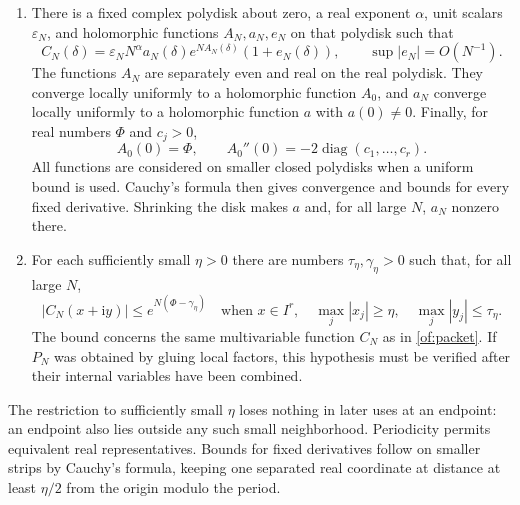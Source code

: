 \documentclass[11pt]{article}
\numberwithin{equation}{section}
\theoremstyle{definition}\newtheorem{definition}[theorem]{Definition}
\theoremstyle{remark}\newtheorem{remark}[theorem]{Remark}
\newcommand{\ii}{\mathrm i}
\begin{document}
\begin{enumerate}[label=(\roman*)]
\item\label{of:Hlocal}
There is a fixed complex polydisk about zero, a real exponent $\alpha$,
unit scalars $\varepsilon_N$, and holomorphic functions $A_N,a_N,e_N$
on that polydisk such that
\begin{equation}\label{of:packet}
 C_N(\delta)=\varepsilon_N N^\alpha a_N(\delta)
                   e^{NA_N(\delta)}(1+e_N(\delta)),
 \qquad \sup|e_N|=O(N^{-1}).
\end{equation}
The functions $A_N$ are separately even and real on the real polydisk.
They converge locally uniformly to a holomorphic function $A_0$, and
$a_N$ converge locally uniformly to a holomorphic function $a$ with
$a(0)\ne0$. Finally, for real numbers $\Phi$ and $c_j>0$,
\begin{equation}\label{of:hessian}
 A_0(0)=\Phi,\qquad A_0''(0)=-2\operatorname{diag}(c_1,\ldots,c_r).
\end{equation}
All functions are considered on smaller closed polydisks when a
uniform bound is used. Cauchy's formula then gives convergence and
bounds for every fixed derivative. Shrinking the disk makes $a$ and,
for all large $N$, $a_N$ nonzero there.

\item\label{of:Hgap}
For each sufficiently small $\eta>0$ there are numbers
$\tau_\eta,\gamma_\eta>0$ such that, for all large $N$,
\begin{equation}\label{of:gap}
 |C_N(x+\ii y)|\le e^{N(\Phi-\gamma_\eta)}
 \quad\text{when }x\in I^r,\quad
 \max_j|x_j|\ge\eta,\quad \max_j|y_j|\le\tau_\eta.
\end{equation}
The bound concerns the same multivariable function $C_N$ as in
\eqref{of:packet}. If $P_N$ was obtained by gluing local factors,
this hypothesis must be verified after their internal variables have
been combined.
\end{enumerate}

The restriction to sufficiently small $\eta$ loses nothing in later
uses at an endpoint: an endpoint also lies outside any such small
neighborhood. Periodicity permits equivalent real representatives.
Bounds for fixed derivatives follow on smaller strips by Cauchy's
formula, keeping one separated real coordinate at distance at least
$\eta/2$ from the origin modulo the period.
\end{document}

